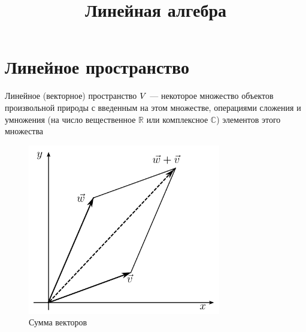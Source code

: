\documentclass{article}
\begin{document}
\title{Линейная алгебра}
\author{}
\date{}
\maketitle

\begin{abstract}
\end{abstract}

\section{Линейное пространство} 
Линейное (векторное) пространство $\mathnormal{V}$ --- 
некоторое множество объектов произвольной природы с введенным на этом 
множестве, операциями сложения и умножения  (на число вещественное 
$\mathbb{R}$ или комплексное $\mathbb{C}$) элементов этого множества 


\begin{figure}[H]
	\centering
	\includegraphics[width=0.75\textwidth]{1vector_sum}  
	\caption{Сумма векторов}
\end{figure}
\end{document}
